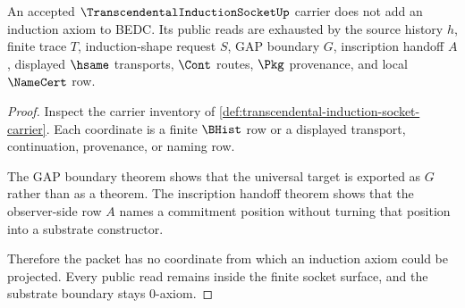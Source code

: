 \begin{theorem}
\label{thm:transcendental-induction-socket-no-internal-axiom}
An accepted $\TranscendentalInductionSocketUp$ carrier does not add an induction axiom to BEDC. Its public reads are exhausted by the source history $h$, finite trace $T$, induction-shape request $S$, GAP boundary $G$, inscription handoff $A$, displayed $\hsame$ transports, $\Cont$ routes, $\Pkg$ provenance, and local $\NameCert$ row.
\end{theorem}
\begin{proof}
Inspect the carrier inventory of \autoref{def:transcendental-induction-socket-carrier}. Each coordinate is a finite $\BHist$ row or a displayed transport, continuation, provenance, or naming row.

The GAP boundary theorem shows that the universal target is exported as $G$ rather than as a theorem. The inscription handoff theorem shows that the observer-side row $A$ names a commitment position without turning that position into a substrate constructor.

Therefore the packet has no coordinate from which an induction axiom could be projected. Every public read remains inside the finite socket surface, and the substrate boundary stays 0-axiom.
\end{proof}

